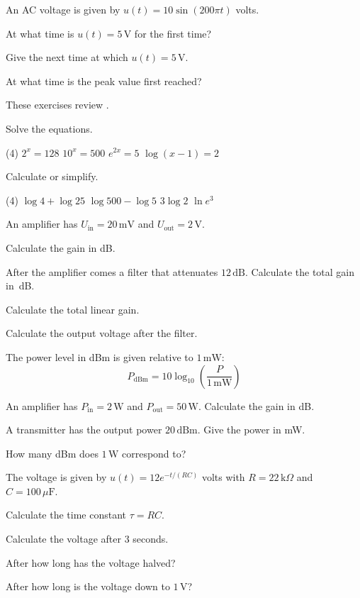 An AC voltage is given by $u(t) = 10\sin(200\pi t)$ volts.
\begin{parts}
  \item At what time is $u(t) = 5\,\text{V}$ for the first time?
  \item Give the next time at which $u(t) = 5\,\text{V}$.
  \item At what time is the peak value first reached?
\end{parts}

These exercises review .

Solve the equations.
\begin{delar}(4)
  \task $2^x = 128$
  \task $10^x = 500$
  \task $e^{2x} = 5$
  \task $\log(x - 1) = 2$
\end{delar}

Calculate or simplify.
\begin{delar}(4)
  \task $\log 4 + \log 25$
  \task $\log 500 - \log 5$
  \task $3\log 2$
  \task $\ln e^3$
\end{delar}

An amplifier has $U_{\text{in}} = 20\,\text{mV}$ and $U_{\text{out}} = 2\,\text{V}$.
\begin{parts}
  \item Calculate the gain in dB.
  \item After the amplifier comes a filter that attenuates $12\,\text{dB}$. Calculate the total
    gain in~dB.
  \item Calculate the total linear gain.
  \item Calculate the output voltage after the filter.
\end{parts}

The power level in dBm is given relative to $1\,\text{mW}$:
\[
  P_{\text{dBm}} = 10\log_{10}\left(\frac{P}{1\,\text{mW}}\right)
\]
\begin{parts}
  \item An amplifier has $P_{\text{in}} = 2\,\text{W}$ and $P_{\text{out}} = 50\,\text{W}$.
    Calculate the gain in dB.
  \item A transmitter has the output power $20\,\text{dBm}$. Give the power in mW.
  \item How many dBm does $1\,\text{W}$ correspond to?
\end{parts}

The voltage is given by $u(t) = 12e^{-t/(RC)}$ volts with $R = 22\,\text{k}\Omega$ and
$C = 100\,\mu\text{F}$.
\begin{parts}
  \item Calculate the time constant $\tau = RC$.
  \item Calculate the voltage after $3$ seconds.
  \item After how long has the voltage halved?
  \item After how long is the voltage down to $1\,\text{V}$?
\end{parts}
